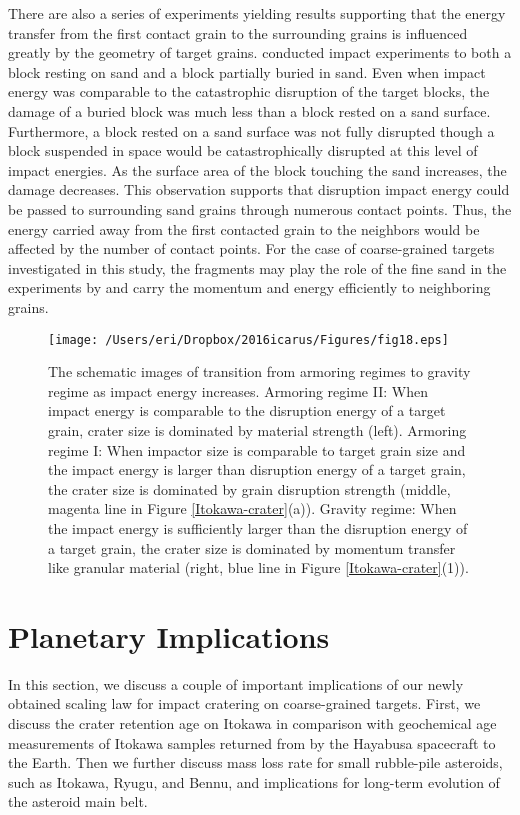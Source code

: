 \documentclass[3p,authoryear]{elsarticle}
\newcommand{\II}{I\hspace{-.1 em}I}
\begin{document}
There are also a series of experiments yielding results supporting that the energy transfer from the first contact grain to the surrounding grains is influenced greatly by the geometry of target grains.
\citet{durda2011} conducted impact experiments to both a block resting on sand and a block partially buried in sand.
Even when impact energy was comparable to the catastrophic disruption of the target blocks, the damage of a buried block was much less than a block rested on a sand surface.
Furthermore, a block rested on a sand surface was not fully disrupted though a block suspended in space would be catastrophically disrupted at this level of impact energies.
As the surface area of the block touching the sand increases, the damage decreases.
This observation supports that disruption impact energy could be passed to surrounding sand grains through numerous contact points.
Thus, the energy carried away from the first contacted grain to the neighbors would be affected by the number of contact points.
For the case of coarse-grained targets investigated in this study, the fragments may play the role of the fine sand in the experiments by \citet{durda2011} and carry the momentum and energy efficiently to neighboring grains.

\begin{figure}[htbp]
	\centering
	\texttt{[image: /Users/eri/Dropbox/2016icarus/Figures/fig18.eps]}
	\caption{The schematic images of transition from armoring regimes to gravity regime as impact energy increases. Armoring regime \II: When impact energy is comparable to the disruption energy of a target grain, crater size is dominated by material strength (left). Armoring regime I: When impactor size is comparable to target grain size and the impact energy is larger than disruption energy of a target grain, the crater size is dominated by grain disruption strength (middle, magenta line in Figure \ref{Itokawa-crater}(a)). Gravity regime: When the impact energy is sufficiently larger than the disruption energy of a target grain, the crater size is dominated by momentum transfer like granular material (right, blue line in Figure \ref{Itokawa-crater}(1)).}
	\label{schema-energy}
	\centering
\end{figure}

\section{Planetary Implications}\label{sec:implication}
In this section, we discuss a couple of important implications of our newly obtained scaling law for impact cratering on coarse-grained targets.
First, we discuss the crater retention age on Itokawa in comparison with geochemical age measurements of Itokawa samples returned from by the Hayabusa spacecraft to the Earth.
Then we further discuss mass loss rate for small rubble-pile asteroids, such as Itokawa, Ryugu, and Bennu, and implications for long-term evolution of the asteroid main belt.
\end{document}
